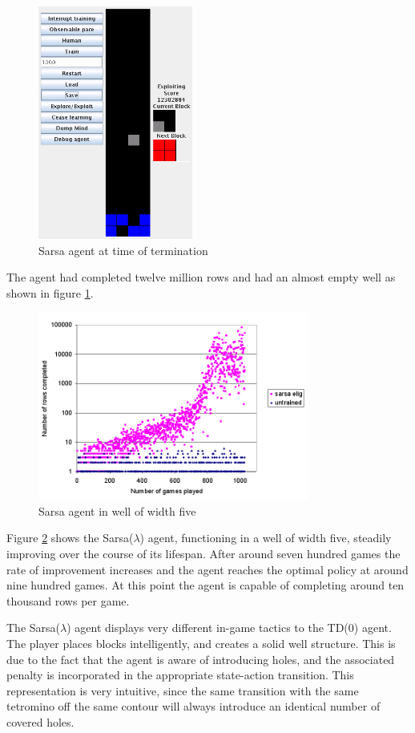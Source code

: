 \documentclass{rucsthesis}
\begin{document}
\begin{figure}[h]
\centering
\includegraphics[width=2in]{sarsaelig4term.png}
\caption{Sarsa agent at time of termination}
\label{fig:sarsaelig4term}
\end{figure}

The agent had completed twelve million rows and had an almost empty well as shown in figure \ref{fig:sarsaelig4term}.

\begin{figure}[h]
\centering
\includegraphics[width=3.5in]{sarsaeligredtet5well.png}
\caption{Sarsa agent in well of width five}
\label{fig:sarsaeligredtet5well}
\end{figure}

Figure \ref{fig:sarsaeligredtet5well} shows the Sarsa($\lambda$) agent, functioning in a well of width five, steadily improving over the course of its lifespan. After around seven hundred games the rate of improvement increases and the agent reaches the optimal policy at around nine hundred games. At this point the agent is capable of completing around ten thousand rows per game.

The Sarsa($\lambda$) agent displays very different in-game tactics to the TD(0) agent. The player places blocks intelligently, and creates a solid well structure. This is due to the fact that the agent is aware of introducing holes, and the associated penalty is incorporated in the appropriate state-action transition. This representation is very intuitive, since the same transition with the same tetromino off the same contour will always introduce an identical number of covered holes.  
\end{document}
